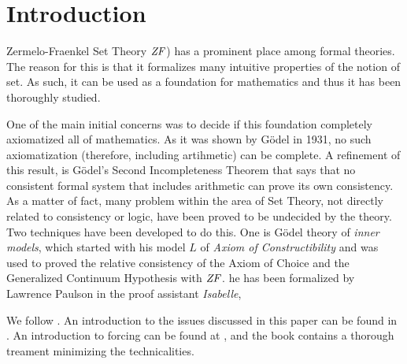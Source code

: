 \section{Introduction}
Zermelo-Fraenkel Set Theory $\mathit{ZF}$) has a prominent place among formal
theories. The reason for this is that it formalizes many intuitive
properties of the notion of set. As such, it can be used as a
foundation for mathematics and thus it has been
thoroughly studied. 

One of the main initial concerns was to decide if this foundation
completely axiomatized all of mathematics. As it was shown by G\"odel
in 1931, no  such axiomatization (therefore, including artihmetic) can
be complete. A refinement of this result, is G\"odel's Second
Incompleteness Theorem that says that no consistent formal system that
includes arithmetic can prove its own consistency. As a matter of
fact, many problem within the area of Set Theory, not directly related
to consistency or logic, have been proved to be undecided by the
theory. Two techniques have been developed to do this. One is G\"odel
theory of \emph{inner models}, which started with his model $L$ of
\emph{Axiom of Constructibility} and was used to proved the relative
consistency of the Axiom of Choice and the Generalized Continuum
Hypothesis with $\mathit{ZF}$.  he has been formalized by Lawrence
Paulson\cite{paulson_2003} in the proof assistant \emph{Isabelle}, 

We follow \cite{kunen2011set}. An introduction to the issues discussed
in this paper can be found in \cite{2018arXiv180705174G}. An
introduction to forcing can be found at \cite{chow-beginner-forcing},
and the book \cite{weaver2014forcing} contains a thorough treament
minimizing the technicalities.


